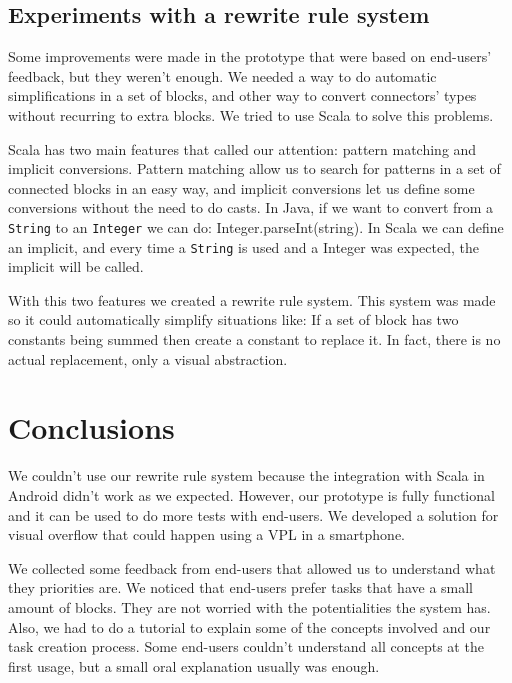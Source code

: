 \documentclass[9pt,a4paper]{extarticle}
\begin{document}
\begin{multicols}{2}
\subsection{Experiments with a rewrite rule system}

Some improvements were made in the prototype that were based on end-users' feedback, but they weren't enough.
We needed a way to do automatic simplifications in a set of blocks, and other way to convert connectors' types without recurring
to extra blocks. We tried to use Scala to solve this problems.

Scala has two main features that called our attention: pattern matching and implicit conversions. Pattern matching allow us to search for patterns in a set of connected blocks in an easy way, and implicit conversions let us define some conversions without the need to do casts. In Java, if we want to convert from a \texttt{String} to an \texttt{Integer} we can do: Integer.parseInt(string). In Scala we can define an implicit,
and every time a \texttt{String} is used and a Integer was expected, the implicit will be called.

With this two features we created a rewrite rule system. This system was made so it could automatically simplify situations like:
If a set of block has two constants being summed then create a constant to replace it. In fact, there is no actual replacement,
only a visual abstraction. 

\section{Conclusions}\label{sec:conclui}

We couldn't use our rewrite rule system because the integration with Scala in Android didn't work as we expected.
However, our prototype is fully functional and it can be used to do more tests with end-users.
We developed a solution for visual overflow that could happen using a VPL in a smartphone. 

We collected some feedback from end-users that allowed us to understand what they priorities are.
We noticed that end-users prefer tasks that have a small amount of blocks. They are not worried with the potentialities
the system has. Also, we had to do a tutorial to explain some of the concepts involved and our task creation process. Some end-users couldn't understand all concepts at the first usage, but a small oral explanation usually was enough. 



\end{multicols}
\end{document}
